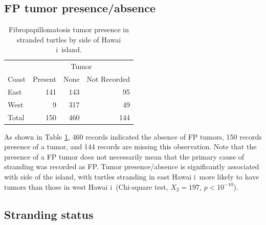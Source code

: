\documentclass[sn-basic,NameDate]{sn-jnl}\usepackage[]{graphicx}\usepackage[]{xcolor}
\newenvironment{knitrout}{}{} %
\DeclareRobustCommand{\okina}{%
  \raisebox{\dimexpr\fontcharht\font`A-\height}{%
    \scalebox{0.8}{`}%
  }%
}
\newcommand{\Hawaii}{Hawai\okina i}
\begin{document}
\subsection{FP tumor presence/absence}

\begin{table}[tbp]
\caption{Fibropapillomatosis tumor presence in stranded turtles by side of \Hawaii\ island.
}\label{tab:tumor_side}
\begin{knitrout}
\color{fgcolor}
\begin{tabular}{lrrr}
\toprule
\multicolumn{1}{c}{ } & \multicolumn{3}{c}{Tumor} \\
\cmidrule(l{3pt}r{3pt}){2-4}
Coast & Present & None & Not Recorded\\
\midrule
East & 141 & 143 & 95\\
West & 9 & 317 & 49\\
\addlinespace
Total & 150 & 460 & 144\\
\bottomrule
\end{tabular}

\end{knitrout}
\end{table}

As shown in Table \ref{tab:tumor_side}, 
460 records indicated the absence of FP tumors,
150 records presence of a tumor, and
144 records are missing this observation. 
Note that the presence of a FP tumor does not necessarily mean that the primary cause of stranding was recorded as FP. 
Tumor presence/absence is significantly associated with side of the island, with turtles stranding in east \Hawaii\ more likely to have tumors than those in west \Hawaii\ (Chi-square test, $X_2=197$, $p < 10^{-10}$).

\subsection{Stranding status}
\end{document}
